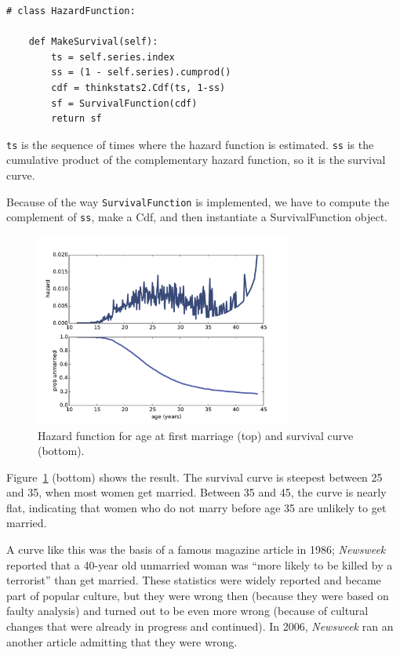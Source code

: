 \documentclass[12pt]{book}
\begin{document}
\begin{verbatim}
# class HazardFunction:

    def MakeSurvival(self):
        ts = self.series.index
        ss = (1 - self.series).cumprod()
        cdf = thinkstats2.Cdf(ts, 1-ss)
        sf = SurvivalFunction(cdf)
        return sf
\end{verbatim}

{\tt ts} is the sequence of times where the hazard function is
estimated.  {\tt ss} is the cumulative product of the complementary
hazard function, so it is the survival curve.

Because of the way {\tt SurvivalFunction} is implemented, we have
to compute the complement of {\tt ss}, make a Cdf, and then instantiate
a SurvivalFunction object.


\begin{figure}
\centerline{\includegraphics[height=2.5in]{figs/survival2.pdf}}
\caption{Hazard function for age at first marriage (top) and
survival curve (bottom).}
\label{survival2}
\end{figure}

Figure~\ref{survival2} (bottom) shows the result.  The survival
curve is steepest between 25 and 35, when most women get married.
Between 35 and 45,
the curve is nearly flat, indicating that women who do not marry
before age 35 are unlikely to get married.

A curve like this was the basis of a famous magazine article in 1986;
{\it Newsweek\/} reported that a 40-year old unmarried woman was ``more
likely to be killed by a terrorist'' than get married.  These
statistics were widely reported and became part of popular culture,
but they were wrong then (because they were based on faulty analysis)
and turned out to be even more wrong (because of cultural changes that
were already in progress and continued).  In 2006, {\it Newsweek\/} ran
an another article admitting that they were wrong.
\end{document}
